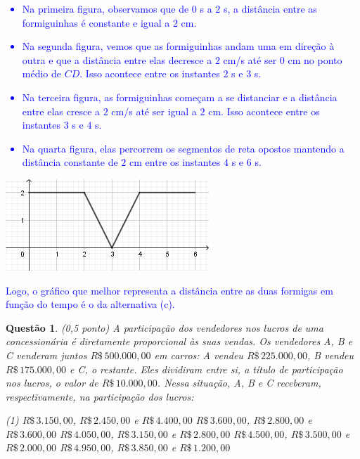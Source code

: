 \documentclass[oneside,a4paper,12pt]{article}
\newcommand{\negrito}[1]{\mbox{\boldmath{$#1$}}}
\theoremstyle{Colorido}
\theoremstyle{solu}
\theoremstyle{dotlessP}
\newtheorem{sol}{Questão}
\begin{document}
\textcolor{blue}{
\begin{itemize}
    \item Na primeira figura, observamos que de $0$ s a $2$ s, a distância entre as formiguinhas é constante e igual a $2$ cm.
    \item Na segunda figura, vemos que as formiguinhas andam uma em direção à outra e que a distância entre elas decresce a $2$ cm/s até ser $0$ cm no ponto médio de $CD$. Isso acontece entre os instantes $2$ s e $3$ s.
    \item  Na terceira figura, as formiguinhas começam a se distanciar e a distância entre elas cresce a $2$ cm/s até ser igual a $2$ cm. Isso acontece entre os instantes $3$ s e $4$ s.
    \item Na quarta figura, elas percorrem os segmentos de reta opostos mantendo a distância constante de $2$ cm entre os instantes $4$ s e $6$ s.
\end{itemize}
\begin{center}
\includegraphics[scale=2.9]{Provas e Avaliações/arq-05 (1).png}
\end{center}
Logo, o gráfico que melhor representa a distância entre as duas formigas em função do tempo é o da alternativa (c).
}
\newpage
	\begin{sol}
\textit{(0,5 ponto)} \newline \newline A participação dos vendedores nos lucros de uma concessionária é diretamente proporcional às suas vendas. Os vendedores A, B e C venderam juntos $R\$\, 500.000,00$ em carros: A vendeu $R\$\, 225.000,00$, B vendeu $R\$\, 175.000,00$ e C, o restante. Eles dividiram entre si, a título de participação nos lucros, o valor de $R\$\, 10.000,00$. Nessa situação, A, B e C receberam, respectivamente, na participação dos lucros:
\begin{tasks}[counter-format={(tsk[a])},label-width=3.6ex, label-format = {\bfseries}, column-sep = {20pt}](1)
\task[\textcolor{blue}{$\negrito{(a)} $}] $R\$\, 3.150,00$, $R\$\, 2.450,00$ e $R\$\, 4.400,00$
\task[\textcolor{blue}{$\negrito{(b)} $}] $R\$\, 3.600,00$, $R\$\, 2.800,00$ e $R\$\, 3.600,00$  
\task[\textcolor{blue}{$\negrito{(c)} $}]$R\$\, 4.050,00$, $R\$\, 3.150,00$ e $R\$\, 2.800,00$          
\task[\textcolor{blue}{$\negrito{(d)} $}] $R\$\, 4.500,00$, $R\$\, 3.500,00$ e $R\$\, 2.000,00$  
\task[\textcolor{blue}{$\negrito{(e)} $}] $R\$\, 4.950,00$, $R\$\, 3.850,00$ e $R\$\, 1.200,00$
\end{tasks}
\end{sol}
\end{document}
